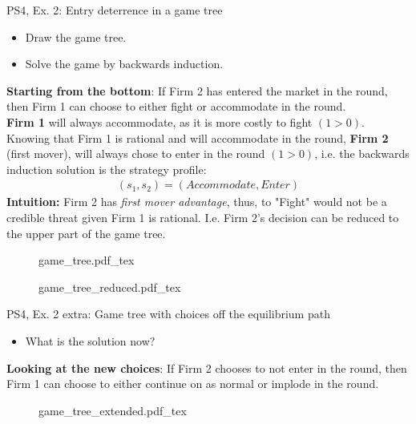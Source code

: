 \begin{frame}{PS4, Ex. 2: Entry deterrence in a game tree}
  \begin{multicols}{2}
    \begin{itemize}
      \item[(a)] Draw the game tree.
      \item[(b)] Solve the game by backwards induction.
    \end{itemize}
    \textbf{Starting from the bottom}: If Firm 2 has entered the market in the  round, then Firm 1 can choose to either fight or accommodate in the  round.\\\medskip
    \textbf{Firm 1} will always accommodate, as it is more costly to fight $(1>0)$.\\\medskip
    Knowing that Firm 1 is rational and will accommodate in the  round, \textbf{Firm 2} (first mover), will always chose to enter in the  round $(1>0)$, i.e. the backwards induction solution is the strategy profile:
      \begin{align*}
        (s_1,s_2)=(Accommodate,Enter)
      \end{align*}
    \textbf{Intuition:} Firm 2 has \textit{first mover advantage}, thus, to "Fight" would not be a credible threat given Firm 1 is rational. I.e. Firm 2's decision can be reduced to the upper part of the game tree.
  \vfill\null \columnbreak
    \begin{figure}[!h]
      \begin{center}
      \def\svgwidth{1.0\columnwidth}
      {game_tree.pdf_tex}
      \end{center}
    \end{figure}
    \begin{figure}[!h]
      \begin{center}
      \def\svgwidth{1.0\columnwidth}
      {game_tree_reduced.pdf_tex}
      \end{center}
    \end{figure}
  \vfill\null
  \end{multicols}
\end{frame}
\begin{frame}{PS4, Ex. 2 extra: Game tree with choices off the equilibrium path}
  \begin{multicols}{2}
    \begin{itemize}
      \item[(a)] What is the solution now?
    \end{itemize}
    \textbf{Looking at the new choices}: If Firm 2 chooses to not enter in the  round, then Firm 1 can choose to either continue on as normal or implode in the  round.
  \vfill\null \columnbreak
    \begin{figure}[!h]
      \begin{center}
      \def\svgwidth{1.0\columnwidth}
      {game_tree_extended.pdf_tex}
      \end{center}
    \end{figure}
  \vfill\null
  \end{multicols}
\end{frame}

